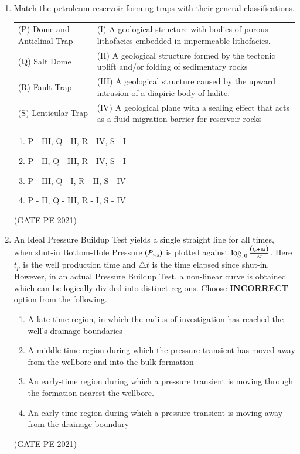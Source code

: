 \documentclass[journal,12pt,onecolumn]{IEEEtran}
\theoremstyle{remark}
\begin{document}
\begin{enumerate}
\item Match the petroleum reservoir forming traps with their general classifications.\\
\begin{tabular}{ll}
(P)  Dome and Anticlinal Trap& (I) A geological structure with bodies of porous lithofacies embedded in impermeable lithofacies.\\
(Q) Salt Dome& (II) A geological structure formed by the tectonic uplift and/or folding of sedimentary rocks\\
(R)  Fault Trap & (III) A geological structure caused by the upward intrusion of a diapiric body of halite. \\
(S) Lenticular Trap & (IV) A geological plane with a sealing effect that acts as a fluid migration barrier for reservoir rocks \\
\end{tabular}
\begin{enumerate}
    \item P - III, Q - II, R - IV, S - I \\
    \item P - II, Q - III, R - IV, S - I\\
    \item P - III, Q - I, R - II, S - IV\\
    \item P - II, Q - III, R - I, S - IV
\end{enumerate}
\hfill{(GATE PE 2021)}

\item An Ideal Pressure Buildup Test yields a single straight line for all times, when shut-in Bottom-Hole Pressure $\left(P_{ws}\right)$ is plotted against
$\log_{10}\frac{\left(t_p+\triangle t \right)}{\triangle t}$. Here $t_p$ is the well production time and $\triangle t$ is the time elapsed since shut-in. However, in an actual Pressure Buildup Test, a non-linear curve is obtained which can be logically divided into distinct regions.
Choose \textbf{INCORRECT} option from the following.
\begin{enumerate}
    \item A late-time region, in which the radius of investigation has reached the well's drainage boundaries
    \item A middle-time region during which the pressure transient has moved away from the wellbore and into the bulk formation
    \item An early-time region during which a pressure transient is moving through the formation nearest the wellbore.
    \item An early-time region during which a pressure transient is moving away from the drainage boundary
\end{enumerate}
\hfill{(GATE PE 2021)}


\end{enumerate}
\end{document}
